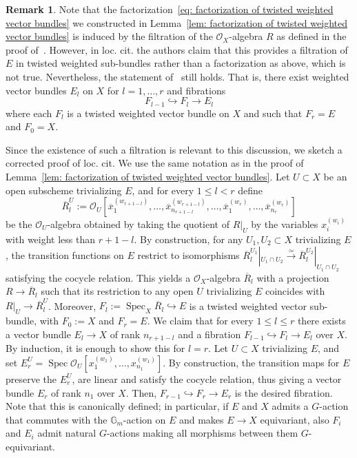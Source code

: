 \documentclass[12pt]{amsart}
\newcommand\spec{\operatorname{Spec}}
\newcommand\Gm{\mathbb{G}_m}
\newcommand{\sO}{\mathscr{O}}
\theoremstyle{definition}
\newtheorem{Rmk}[theorem]{Remark}
\begin{document}
\begin{Rmk}\label{rmk: mistake in Arena-Obinna}
    Note that the factorization~\eqref{eq: factorization of twisted weighted vector bundles} we constructed in Lemma~\ref{lem: factorization of twisted weighted vector bundles} is induced by the filtration of the $\sO_X$-algebra $R$ as defined in the proof of~\cite[Proposition 3.8]{Arena-Obinna}. However, in loc.\! cit.\! the authors claim that this provides a filtration of $E$ in twisted weighted sub-bundles rather than a factorization as above, which is not true. Nevertheless, the statement of~\cite[Proposition 3.8]{Arena-Obinna} still holds. That is, there exist weighted vector bundles $E_l$ on $X$ for $l=1,\ldots,r$ and fibrations
    $$
    F_{l-1} \hookrightarrow F_l \to E_{l}
    $$
    where each $F_l$ is a twisted weighted vector bundle on $X$ and such that $F_{r}=E$ and $F_0=X$.    
    
    Since the existence of such a filtration is relevant to this discussion, we sketch a corrected proof of loc.\! cit.\!
    We use the same notation as in the proof of Lemma~\ref{lem: factorization of twisted weighted vector bundles}. Let $U\subset X$ be an open subscheme trivializing $E$, and for every $1\leq l<r$ define
    \[
        \overline{R}^U_l:=\sO_{U}[\overline{x}_1^{(w_{r+1-l})},\ldots,\overline{x}_{n_{r+1-l}}^{(w_{r+1-l})},\ldots,\overline{x}_1^{(w_r)},\ldots,\overline{x}_{n_r}^{(w_r)}]
    \]
    be the $\sO_U$-algebra obtained by taking the quotient of $R|_U$ by the variables $x_i^{(w_i)}$ with weight less than $r+1-l$. By construction, for any $U_1,U_2\subset X$ trivializing $E$, the transition functions on $E$ restrict to isomorphisms $\overline{R}_l^{U_1}|_{U_1 \cap U_2}\xrightarrow{\simeq}\overline{R}_l^{U_2}|_{U_1 \cap U_2}$ satisfying the cocycle relation. This yields a $\sO_X$-algebra $\overline{R}_l$ with a projection $R\rightarrow\overline{R}_l$ such that its restriction to any open $U$ trivializing $E$ coincides with $R|_U\rightarrow\overline{R}_l^U$. Moreover, $F_l:=\spec_{X}\!\overline{R}_l\hookrightarrow E$ is a twisted weighted vector sub-bundle, with $F_0:=X$ and $F_r=E$. We claim that for every $1\leq l\leq r$ there exists a vector bundle $E_l\rightarrow X$ of rank $n_{r+1-l}$ and a fibration $F_{l-1}\hookrightarrow F_l\rightarrow E_l$ over $X$. By induction, it is enough to show this for $l=r$. Let $U\subset X$ trivializing $E$, and set $E_r^U=\spec\sO_U[x_1^{(w_1)},\ldots,x_{n_1}^{(w_1)}]$. By construction, the transition maps for $E$ preserve the $E_r^U$, are linear and satisfy the cocycle relation, thus giving a vector bundle $E_r$ of rank $n_1$ over $X$. Then, $F_{r-1}\hookrightarrow F_r\rightarrow E_r$ is the desired fibration. Note that this is canonically defined; in particular, if $E$ and $X$ admits a $G$-action that commutes with the $\Gm$-action on $E$ and makes $E\rightarrow X$ equivariant, also $F_i$ and $E_i$ admit natural $G$-actions making all morphisms between them $G$-equivariant.


\end{Rmk}
\end{document}
